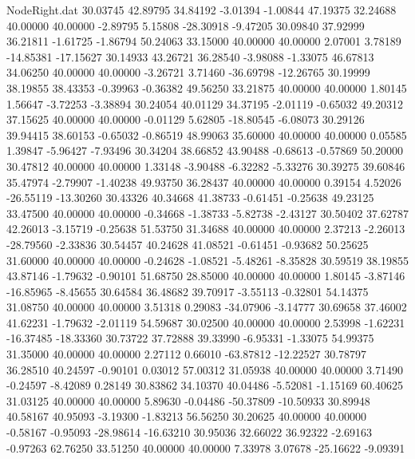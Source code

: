 \begin{filecontents}{NodeRight.dat}
  30.03745   42.89795   34.84192    -3.01394   -1.00844   47.19375   32.24688   40.00000   40.00000   -2.89795    5.15808  -28.30918   -9.47205
  30.09840   37.92999   36.21811    -1.61725   -1.86794   50.24063   33.15000   40.00000   40.00000    2.07001    3.78189  -14.85381  -17.15627
  30.14933   43.26721   36.28540    -3.98088   -1.33075   46.67813   34.06250   40.00000   40.00000   -3.26721    3.71460  -36.69798  -12.26765
  30.19999   38.19855   38.43353    -0.39963   -0.36382   49.56250   33.21875   40.00000   40.00000    1.80145    1.56647   -3.72253   -3.38894
  30.24054   40.01129   34.37195    -2.01119   -0.65032   49.20312   37.15625   40.00000   40.00000   -0.01129    5.62805  -18.80545   -6.08073
  30.29126   39.94415   38.60153    -0.65032   -0.86519   48.99063   35.60000   40.00000   40.00000    0.05585    1.39847   -5.96427   -7.93496
  30.34204   38.66852   43.90488    -0.68613   -0.57869   50.20000   30.47812   40.00000   40.00000    1.33148   -3.90488   -6.32282   -5.33276
  30.39275   39.60846   35.47974    -2.79907   -1.40238   49.93750   36.28437   40.00000   40.00000    0.39154    4.52026  -26.55119  -13.30260
  30.43326   40.34668   41.38733    -0.61451   -0.25638   49.23125   33.47500   40.00000   40.00000   -0.34668   -1.38733   -5.82738   -2.43127
  30.50402   37.62787   42.26013    -3.15719   -0.25638   51.53750   31.34688   40.00000   40.00000    2.37213   -2.26013  -28.79560   -2.33836
  30.54457   40.24628   41.08521    -0.61451   -0.93682   50.25625   31.60000   40.00000   40.00000   -0.24628   -1.08521   -5.48261   -8.35828
  30.59519   38.19855   43.87146    -1.79632   -0.90101   51.68750   28.85000   40.00000   40.00000    1.80145   -3.87146  -16.85965   -8.45655
  30.64584   36.48682   39.70917    -3.55113   -0.32801   54.14375   31.08750   40.00000   40.00000    3.51318    0.29083  -34.07906   -3.14777
  30.69658   37.46002   41.62231    -1.79632   -2.01119   54.59687   30.02500   40.00000   40.00000    2.53998   -1.62231  -16.37485  -18.33360
  30.73722   37.72888   39.33990    -6.95331   -1.33075   54.99375   31.35000   40.00000   40.00000    2.27112    0.66010  -63.87812  -12.22527
  30.78797   36.28510   40.24597    -0.90101    0.03012   57.00312   31.05938   40.00000   40.00000    3.71490   -0.24597   -8.42089    0.28149
  30.83862   34.10370   40.04486    -5.52081   -1.15169   60.40625   31.03125   40.00000   40.00000    5.89630   -0.04486  -50.37809  -10.50933
  30.89948   40.58167   40.95093    -3.19300   -1.83213   56.56250   30.20625   40.00000   40.00000   -0.58167   -0.95093  -28.98614  -16.63210
  30.95036   32.66022   36.92322    -2.69163   -0.97263   62.76250   33.51250   40.00000   40.00000    7.33978    3.07678  -25.16622   -9.09391

\end{filecontents}
